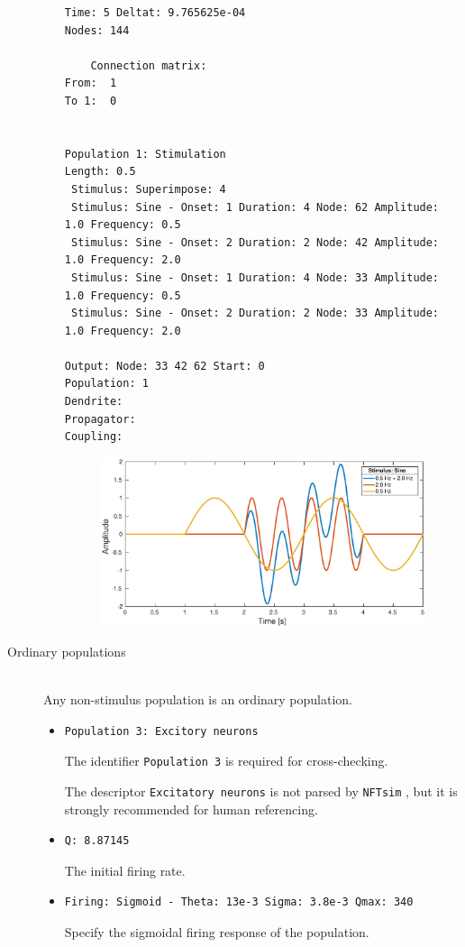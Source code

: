 \documentclass[12pt,a4paper]{article}
\newcommand{\type}[1]{{\small\small\tt #1} }
\newcommand{\NF}[0]{\type{NFTsim}}
\begin{document}
\begin{description}
\begin{itemize}
    \begin{lstlisting}
Time: 5 Deltat: 9.765625e-04
Nodes: 144

    Connection matrix:
From:  1 
To 1:  0


Population 1: Stimulation
Length: 0.5
 Stimulus: Superimpose: 4
 Stimulus: Sine - Onset: 1 Duration: 4 Node: 62 Amplitude: 1.0 Frequency: 0.5
 Stimulus: Sine - Onset: 2 Duration: 2 Node: 42 Amplitude: 1.0 Frequency: 2.0
 Stimulus: Sine - Onset: 1 Duration: 4 Node: 33 Amplitude: 1.0 Frequency: 0.5
 Stimulus: Sine - Onset: 2 Duration: 2 Node: 33 Amplitude: 1.0 Frequency: 2.0

Output: Node: 33 42 62 Start: 0
Population: 1
Dendrite:  
Propagator:
Coupling: 
    \end{lstlisting}
\begin{figure}[h]
\begin{center}
 \includegraphics[width=\textwidth]{img/stimulus_sine.eps}
\end{center}
\end{figure}

    \end{itemize}
\item[Ordinary populations]\ \\
    Any non-stimulus population is an ordinary population.

    \begin{itemize}
    \item
    \begin{lstlisting}
Population 3: Excitory neurons
    \end{lstlisting}
    The identifier \type{Population 3} is required for cross-checking.

    The descriptor \type{Excitatory neurons} is not parsed by \NF, but it is strongly recommended for human referencing.
    \item
    \begin{lstlisting}
Q: 8.87145
    \end{lstlisting}
    The initial firing rate.
    \item
    \begin{lstlisting}
Firing: Sigmoid - Theta: 13e-3 Sigma: 3.8e-3 Qmax: 340
    \end{lstlisting}
    Specify the sigmoidal firing response of the population.


\end{itemize}
\end{description}
\end{document}
